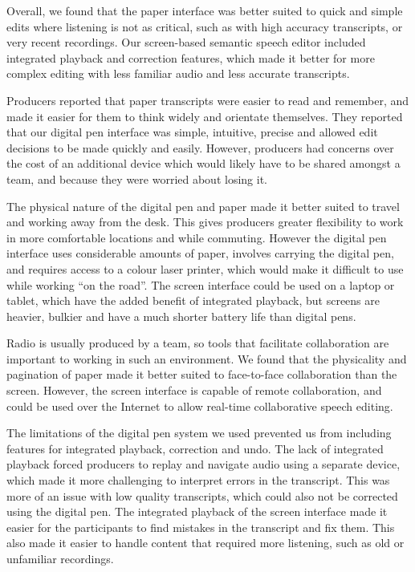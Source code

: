 Overall, we found that the paper interface was better suited to quick and simple edits where listening is not as
critical, such as with high accuracy transcripts, or very recent recordings.  Our screen-based semantic speech editor
included integrated playback and correction features, which made it better for more complex editing with less familiar
audio and less accurate transcripts.

Producers reported that paper transcripts were easier to read and remember, and made it easier for them to think widely
and orientate themselves.  They reported that our digital pen interface was simple, intuitive, precise and allowed edit
decisions to be made quickly and easily.  However, producers had concerns over the cost of an additional device which
would likely have to be shared amongst a team, and because they were worried about losing it.

The physical nature of the digital pen and paper made it better suited to travel and working away from the desk. This
gives producers greater flexibility to work in more comfortable locations and while commuting.  However the digital pen
interface uses considerable amounts of paper, involves carrying the digital pen, and requires access to a colour laser
printer, which would make it difficult to use while working ``on the road''.  The screen interface could be used on a
laptop or tablet, which have the added benefit of integrated playback, but screens are heavier, bulkier and have a much
shorter battery life than digital pens.

Radio is usually produced by a team, so tools that facilitate collaboration are important to working in such an
environment.  We found that the physicality and pagination of paper made it better suited to face-to-face collaboration
than the screen. However, the screen interface is capable of remote collaboration, and could be used over the Internet
to allow real-time collaborative speech editing.

The limitations of the digital pen system we used prevented us from including features for integrated playback,
correction and undo. The lack of integrated playback forced producers to replay and navigate audio using a separate
device, which made it more challenging to interpret errors in the transcript. This was more of an issue with low
quality transcripts, which could also not be corrected using the digital pen.  The integrated playback of the screen
interface made it easier for the participants to find mistakes in the transcript and fix them.  This also made it
easier to handle content that required more listening, such as old or unfamiliar recordings.

